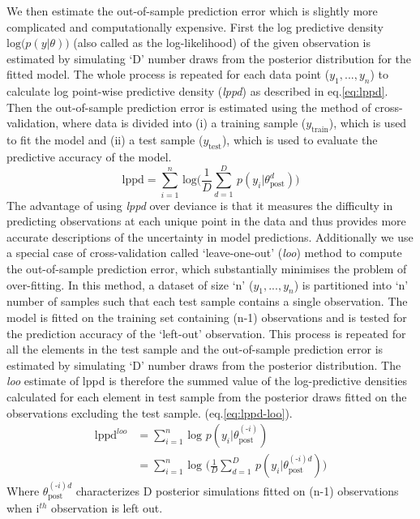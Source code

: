 \documentclass[11pt]{article}
\newcommand{\red}[1]{{\color{red}{#1}}}
\newcommand{\be}{\begin{equation}}
\newcommand{\ee}{\end{equation}}
\begin{document}
We then estimate the out-of-sample prediction error which is slightly more complicated and computationally expensive.
First the log predictive density $\text{log}\big(p(y|\theta)\big)$ (also called as the log-likelihood) of the given observation is estimated by simulating `D' number draws from the posterior distribution for the fitted model. 
The whole process is repeated for each data point ($y_1,... , y_n$) to calculate log point-wise predictive density (\textit{lppd}) as described in eq.\ref{eq:lppd}.
Then the out-of-sample prediction error is estimated using the method of cross-validation, where data is divided into (i) a training sample ($y_{\text{train}}$), which is used to fit the model and (ii) a test sample ($y_{\text{test}}$), which is used to evaluate the predictive accuracy of the model.
\be
\text{lppd} = \sum_{i=1}^{n} \, \text{log} \bigg(\frac{1}{D} \sum_{d=1}^{D} \, p(y_i | \theta_{\text{post}}^d) \bigg)
\label{eq:lppd}
\ee
The advantage of using \textit{lppd} over deviance is that it measures the difficulty in predicting observations at each unique point in the data and thus provides more accurate descriptions of the uncertainty in model predictions.
Additionally we use a special case of cross-validation called `leave-one-out' (\textit{loo}) method to compute the out-of-sample prediction error, which substantially minimises the problem of over-fitting. \red{(i.e. model learning too much from the data).}
In this method, a dataset of size `n' ($y_1,... , y_n$) is partitioned into `n' number of samples such that each test sample contains a single observation. 
The model is fitted on the training set containing (n-1) observations and is tested for the prediction accuracy of the `left-out' observation. 
This process is repeated for all the elements in the test sample and the out-of-sample prediction error is estimated by simulating `D' number draws from the posterior distribution.
The \textit{loo} estimate of lppd is therefore the summed value of the log-predictive densities calculated for each element in test sample from the posterior draws fitted on the observations excluding the test sample. 
 (eq.\ref{eq:lppd-loo}).
\be
\begin{aligned}
\text{lppd}^{loo} &= \sum_{i=1}^{n} \, \text{log} \,\, p(y_i | \theta_{\text{post}}^{(\text{-}i)}) \\
                  &= \sum_{i=1}^{n} \, \text{log} \,\,  \bigg(\frac{1}{D} \sum_{d=1}^{D} \, p(y_i | \theta_{\text{post}}^{(\text{-}i)d}) \bigg)
\end{aligned}
\label{eq:lppd-loo}
\ee
Where $\theta_{\text{post}}^{(\text{-}i)d}$ characterizes D posterior simulations fitted on (n-1) observations when i$^{th}$ observation is left out.
\end{document}
